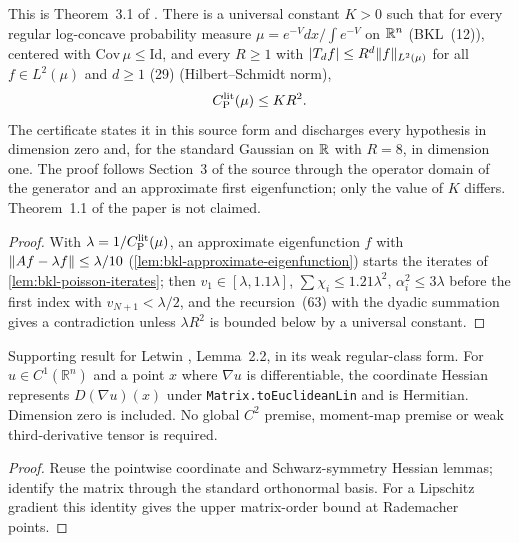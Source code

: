 \begin{theorem}
  \label{thm:bkl-taylor-criterion}
  \leanok
  This is Theorem~3.1 of \cite{BizeulKlartagLehec2026}.  There is a universal constant $K>0$ such that
  for every regular log-concave probability measure $\mu=e^{-V}dx/\int e^{-V}$ on $\mathbb{R}^n$ (BKL~(12)),
  centered with $\mathrm{Cov}\,\mu\le\mathrm{Id}$, and every $R\ge1$ with
  $\lvert T_df\rvert\le R^d\lVert f\rVert_{L^2(\mu)}$ for all $f\in L^2(\mu)$ and $d\ge1$ (29) (Hilbert--Schmidt
  norm),
  \[
    C_{\mathrm P}^{\mathrm{lit}}(\mu)\le KR^2.
  \]
  The certificate states it in this source form and discharges every hypothesis in dimension zero
  and, for the standard Gaussian on $\mathbb{R}$ with $R=8$, in dimension one.
  The proof follows Section~3 of the source through the operator domain of the generator and an
  approximate first eigenfunction; only the value of $K$ differs.  Theorem~1.1 of the paper is not
  claimed.
\end{theorem}
\begin{proof}
  \leanok
  With $\lambda=1/C_{\mathrm P}^{\mathrm{lit}}(\mu)$, an approximate eigenfunction $f$ with $\lVert Af-\lambda f\rVert\le\lambda/10$
  (\cref{lem:bkl-approximate-eigenfunction}) starts the iterates of \cref{lem:bkl-poisson-iterates};
  then $v_1\in[\lambda,1.1\lambda]$, $\sum\chi_i\le1.21\lambda^2$, $\alpha_i^2\le3\lambda$ before the
  first index with $v_{N+1}<\lambda/2$, and the recursion~(63) with the dyadic summation gives a
  contradiction unless $\lambda R^2$ is bounded below by a universal constant.
\end{proof}


\begin{lemma}
  \label{lem:letwin-weak-hessian-identification}
  \leanok
  Supporting result for Letwin \cite{Letwin2026QuadraticKLS}, Lemma~2.2, in its weak regular-class form.
  For $u\in C^1(\mathbb R^n)$ and a point $x$ where $\nabla u$ is differentiable, the coordinate Hessian
  represents $D(\nabla u)(x)$ under \texttt{Matrix.toEuclideanLin} and is Hermitian. Dimension zero is included.
  No global $C^2$ premise, moment-map premise or weak third-derivative tensor is required.
\end{lemma}
\begin{proof}
  \leanok
  Reuse the pointwise coordinate and Schwarz-symmetry Hessian lemmas; identify
  the matrix through the standard orthonormal basis. For a Lipschitz gradient this
  identity gives the upper matrix-order bound at Rademacher points.
\end{proof}

